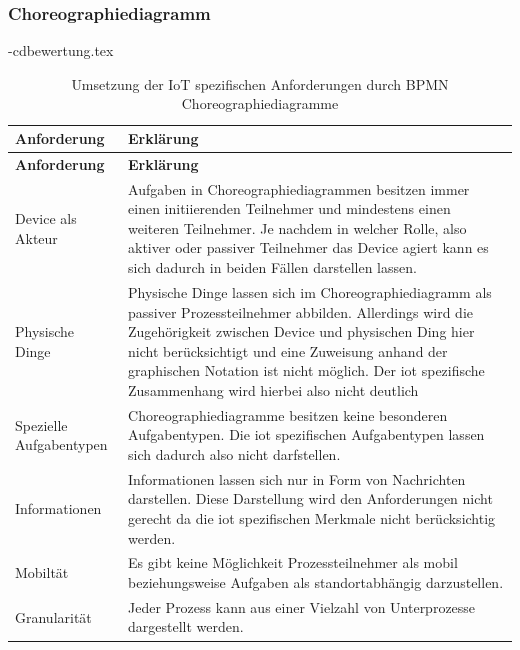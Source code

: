 \documentclass[a4paper, 12pt, twoside, headsepline=true]{scrartcl} %
\begin{document}
\subsubsection{Choreographiediagramm}
\begin{filecontents}{\jobname-cdbewertung.tex}
	\begin{longtable}{P{4cm}|X}
		\caption{Umsetzung der IoT spezifischen Anforderungen durch BPMN Choreographiediagramme}\\
		\label{table:evaluierungskriterien}
		\textbf{Anforderung} & \textbf{Erklärung}   \\
		\hline
		\endfirsthead %
		\textbf{Anforderung} & \textbf{Erklärung}  \\
		\hline
		\endhead %
		Device als Akteur & Aufgaben in Choreographiediagrammen besitzen immer einen initiierenden Teilnehmer und mindestens einen weiteren Teilnehmer. Je nachdem in welcher Rolle, also aktiver oder passiver Teilnehmer das Device agiert kann es sich dadurch in beiden Fällen darstellen lassen.\\ \hline
		Physische Dinge  & Physische Dinge lassen sich im Choreographiediagramm als passiver Prozessteilnehmer abbilden. Allerdings wird die Zugehörigkeit zwischen Device und physischen Ding hier nicht berücksichtigt und eine Zuweisung anhand der graphischen Notation ist nicht möglich. Der \ac{iot} spezifische Zusammenhang wird hierbei also nicht deutlich\\ \hline
		Spezielle Aufgabentypen & Choreographiediagramme besitzen keine besonderen Aufgabentypen. Die \ac{iot} spezifischen Aufgabentypen lassen sich dadurch also nicht darfstellen. \\ \hline
		Informationen  &  Informationen lassen sich nur in Form von Nachrichten darstellen. Diese Darstellung wird den Anforderungen nicht gerecht da die \ac{iot} spezifischen Merkmale nicht berücksichtig werden.\\ \hline
		Mobiltät & Es gibt keine Möglichkeit Prozessteilnehmer als mobil beziehungsweise Aufgaben als standortabhängig darzustellen.\\ \hline
		Granularität & Jeder Prozess kann aus einer Vielzahl von Unterprozesse dargestellt werden.\\
	\end{longtable}
\end{filecontents}
\end{document}
